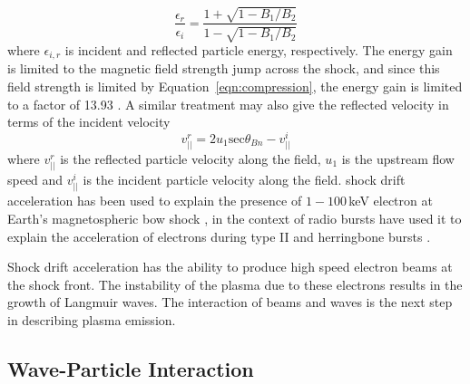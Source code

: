 \begin{equation}
\frac{\epsilon_r}{\epsilon_i} = \frac{1+\sqrt{1-B_1/B_2}}{1-\sqrt{1-B_1/B_2}}
\end{equation}
where $\epsilon_{i,r}$ is incident and reflected particle energy, respectively. The energy gain is limited to the magnetic field strength jump across the shock, and since this field strength is limited by Equation~\ref{eqn:compression}, the energy gain is limited to a factor of 13.93 \citep{ball2001}. A similar treatment may also give the reflected velocity in terms of the incident velocity \citep{holman1983}
\begin{equation}
v^r_{||} = 2u_1\mathrm{sec}\theta_{Bn} - v^i_{||}
\end{equation}
where $v^r_{||}$ is the reflected particle velocity along the field, $u_1$ is the upstream flow speed and $v^i_{||}$ is the incident particle velocity along the field. shock drift acceleration has been used to explain the presence of $1-100$\,keV electron at Earth's magnetospheric bow shock \citep{wu1984}, in the context of radio bursts have used it to explain the acceleration of electrons during type II and herringbone bursts \citep{holman1983, mann2005, schmidt2012b}. 

Shock drift acceleration has the ability to produce high speed electron beams at the shock front. The instability of the plasma due to these electrons results in the growth of Langmuir waves. The interaction of beams and waves is the next step in describing plasma emission.



\subsection{Wave-Particle Interaction}\label{sec:wave_particle}

